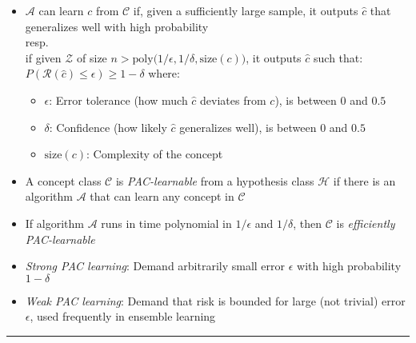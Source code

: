 \begin{itemize}
    \item $\mathcal{A}$ can learn $c$ from $\mathcal{C}$ if, given a sufficiently large sample, it outputs $\hat{c}$ that generalizes well with high probability\\
    resp.\\
    if given $\mathcal{Z}$ of size $n > \textrm{poly}\big(1/\epsilon, 1/\delta, \textrm{size}(c)\big)$, it outputs $\hat{c}$ such that:
    $
    P(\mathcal{R}(\hat{c}) \leq \epsilon) \geq 1 - \delta
    $
    where:
    \begin{itemize}
        \item $\epsilon$: Error tolerance (how much $\hat{c}$ deviates from $c$), is between $0$ and $0.5$
        \item $\delta$: Confidence (how likely $\hat{c}$ generalizes well), is between $0$ and $0.5$
        \item $\textrm{size}(c)$: Complexity of the concept
    \end{itemize}
    \item A concept class $\mathcal{C}$ is \emph{PAC-learnable} from a hypothesis class $\mathcal{H}$ if there is an algorithm $\mathcal{A}$ that can learn any concept in $\mathcal{C}$
    \item If algorithm $\mathcal{A}$ runs in time polynomial in $1/\epsilon$ and $1/\delta$, then $\mathcal{C}$ is \emph{efficiently PAC-learnable}
    \item \emph{Strong PAC learning}: Demand arbitrarily small error $\epsilon$ with high probability $1 - \delta$
    \item \emph{Weak PAC learning}: Demand that risk is bounded for large (not trivial) error $\epsilon$, used frequently in ensemble learning
\end{itemize}

{\color{black}\hrule height 0.001mm}

